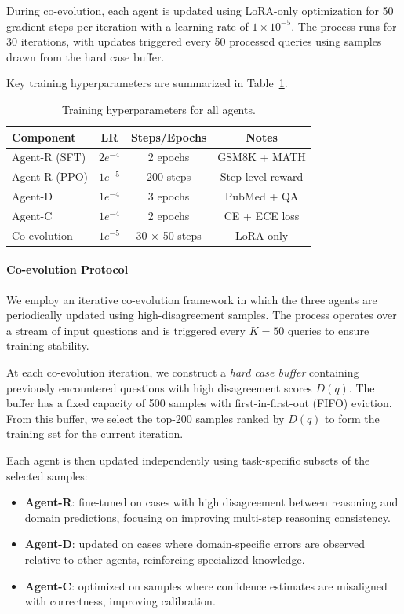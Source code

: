 \documentclass{article}
\begin{document}
During co-evolution, each agent is updated using LoRA-only optimization for 50 gradient steps per iteration with a learning rate of $1 \times 10^{-5}$. The process runs for 30 iterations, with updates triggered every 50 processed queries using samples drawn from the hard case buffer.

Key training hyperparameters are summarized in Table~\ref{tab:training}.

\begin{table}[h]
\centering
\caption{Training hyperparameters for all agents.}
\label{tab:training}
\begin{tabular}{lccc}
\toprule
\textbf{Component} & \textbf{LR} & \textbf{Steps/Epochs} & \textbf{Notes} \\
\midrule
Agent-R (SFT) & $2e^{-4}$ & 2 epochs & GSM8K + MATH \\
Agent-R (PPO) & $1e^{-5}$ & 200 steps & Step-level reward \\
Agent-D & $1e^{-4}$ & 3 epochs & PubMed + QA \\
Agent-C & $1e^{-4}$ & 2 epochs & CE + ECE loss \\
Co-evolution & $1e^{-5}$ & 30 $\times$ 50 steps & LoRA only \\
\bottomrule
\end{tabular}
\end{table}
\paragraph{Co-evolution Protocol}
We employ an iterative co-evolution framework in which the three agents are periodically updated using high-disagreement samples. The process operates over a stream of input questions and is triggered every $K=50$ queries to ensure training stability.

At each co-evolution iteration, we construct a \textit{hard case buffer} containing previously encountered questions with high disagreement scores $D(q)$. The buffer has a fixed capacity of 500 samples with first-in-first-out (FIFO) eviction. From this buffer, we select the top-200 samples ranked by $D(q)$ to form the training set for the current iteration.

Each agent is then updated independently using task-specific subsets of the selected samples:
\begin{itemize}
    \item \textbf{Agent-R}: fine-tuned on cases with high disagreement between reasoning and domain predictions, focusing on improving multi-step reasoning consistency.
    \item \textbf{Agent-D}: updated on cases where domain-specific errors are observed relative to other agents, reinforcing specialized knowledge.
    \item \textbf{Agent-C}: optimized on samples where confidence estimates are misaligned with correctness, improving calibration.
\end{itemize}
\end{document}

